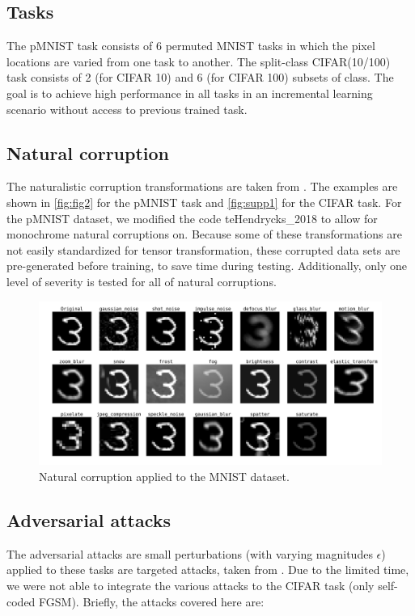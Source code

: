 \documentclass[manuscript,screen,review=false, nonacm]{acmart}
\begin{document}
\subsection{Tasks}

The pMNIST task consists of 6 permuted MNIST tasks in which the pixel locations are varied from one task to another. The split-class CIFAR(10/100) task consists of 2 (for CIFAR 10) and 6 (for CIFAR 100) subsets of class. The goal is to achieve high performance in all tasks in an incremental learning scenario without access to previous trained task. 
\subsection{Natural corruption}

The naturalistic corruption transformations are taken from \cite{Hendrycks_2018}. The examples are shown in \autoref{fig:fig2} for the pMNIST task and \autoref{fig:supp1} for the CIFAR task. For the pMNIST dataset, we modified the code te{Hendrycks_2018} to allow for monochrome natural corruptions on. Because some of these transformations are not easily standardized for tensor transformation, these corrupted data sets are pre-generated before training, to save time during testing. Additionally, only one level of severity is tested for all of natural corruptions.

\begin{figure}[ht]
    \centering
    \includegraphics[width=\textwidth]{figures/report/Fig2.png}
    \caption{Natural corruption applied to the MNIST dataset.}
    \label{fig:fig2}
\end{figure}

\subsection{Adversarial attacks}

The adversarial attacks are small perturbations (with varying magnitudes $\epsilon$) applied to these tasks are targeted attacks, taken from \cite{rauber2017foolbox,rauber2017foolboxnative}. Due to the limited time, we were not able to integrate the various attacks to the CIFAR task (only self-coded FGSM). Briefly, the attacks covered here are:
\end{document}
